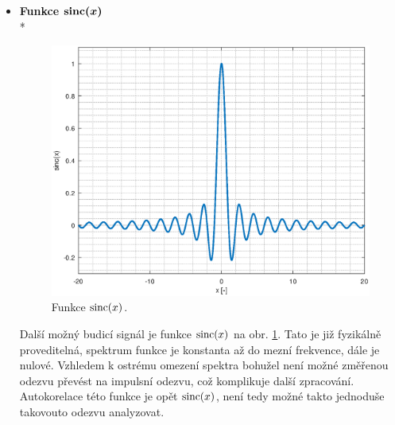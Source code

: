 \begin{itemize}
	Tento budicí signál je možné jednoduše generovat pomocí rychlých logických obvodů. Moderní logické obvody používané pro vysokorychlostní spoje (\acrshort{SATA}, \acrshort{SAS}, \acrshort{USB}\,3, \acrshort{PCI-E}) v řádu jednotek \si{\giga\bit\per\second} již mají náběžné hrany o délce kratší než 100 ps \cite{SY54017datasheet}, \cite{SN75LVCP600Sdatasheet}, \cite{SN65LVPE501datasheet}, \cite{TUSB1002Adatasheet}. Vzhledem k tomu, že pro převod skokové odezvy na impulsní je možné použít jednoduchý vztah
	\begin{equation}
	h(t)=\dv{a(t)}{t},
	\end{equation} a že je syntéza jednotkového skoku možná přímo pomocí logického obvodu, je výhodnější použít jednotkový skok než Diracovo delta. Pravděpodobně z těchto důvodů se u běžných reflektometrů používá právě jednotkový skok jako budicí signál.
	
	\item
	\textbf{Funkce $\boldsymbol{\operatorname{sinc}(x)}$}\\*	
	\begin{figure}[htbp]\includegraphics[width=\textwidth,keepaspectratio]{images/sinc.eps}\caption{Funkce $\operatorname{sinc}(x)$.}\label{sinc}\end{figure}		
	
	Další možný budicí signál je funkce $\operatorname{sinc}(x)$ na obr. \ref{sinc}. Tato je již fyzikálně proveditelná, spektrum funkce je konstanta až do mezní frekvence, dále je nulové. Vzhledem k ostrému omezení spektra bohužel není možné změřenou odezvu převést na impulsní odezvu, což komplikuje další zpracování. Autokorelace této funkce je opět $\operatorname{sinc}(x)$, není tedy možné takto jednoduše takovouto odezvu analyzovat.
	

\end{itemize}

